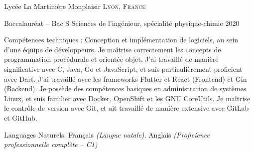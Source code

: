 \documentclass[10pt,a4paper]{article} %
\begin{document}

\headedsection %
{Lycée La Martinière Monplaisir}
{\textsc{Lyon, France}} {

\headedsubsection %
{Baccalauréat -- Bac S Sciences de l'ingénieur, spécialité physique-chimie}
{2020} {}
}

\spacedhrule{0.5em}{-0.4em} %



\inlineheadsection %
{Compétences techniques :}
{Conception et implémentation de logiciels, au sein d'une équipe de développeurs. Je maîtrise correctement les concepts de programmation procédurale et orientée objet. J'ai travaillé de manière significative avec C, Java, Go et JavaScript, et suis particulièrement proficient avec Dart. J'ai travaillé avec les frameworks Flutter et React (Frontend) et Gin (Backend). Je possède des compétences basiques en administration de systèmes Linux, et suis familier avec Docker, OpenShift et les GNU CoreUtils. Je maîtrise le contrôle de version avec Git, et ait travaillé de manière extensive avec GitLab et GitHub. }



\inlineheadsection %
{Languages Naturels:}
{Français \textit{(Langue natale)}, Anglais \textit{(Proficience professionnelle complète -- C1)}}
\end{document}
